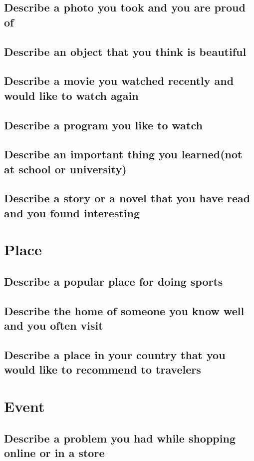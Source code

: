 \documentclass[conference]{IEEEtran}
\begin{document}
\subsection{Describe a photo you took and you are proud of}
\subsection{Describe an object that you think is beautiful}
\subsection{Describe a movie you watched recently and would like to watch again}
\subsection{Describe a program you like to watch}
\subsection{Describe an important thing you learned(not at school or university)}
\subsection{Describe a story or a novel that you have read and you found interesting}


\section{Place}
\subsection{Describe a popular place for doing sports}
\subsection{Describe the home of someone you know well and you often visit}
\subsection{Describe a place in your country that you would like to recommend to
travelers}

\section{Event}
\subsection{Describe a problem you had while shopping online or in a store}
\end{document}
